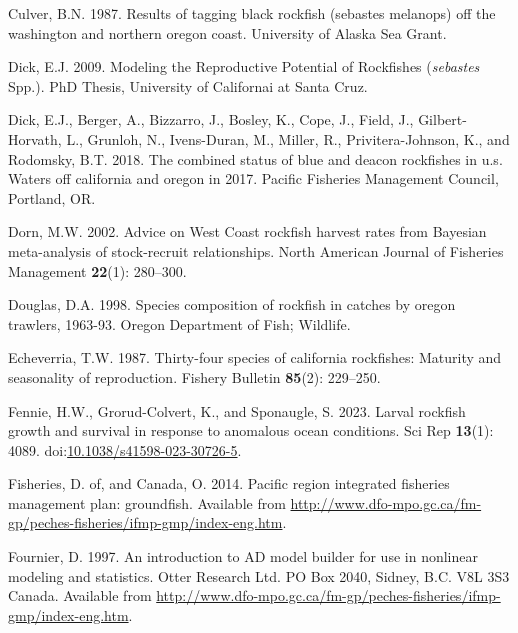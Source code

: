 \documentclass[11pt,
  letterpaper,
]{article}
\newlength{\cslhangindent}
\newenvironment{CSLReferences}[2] %
 {%
  \setlength{\parindent}{0pt}
  \ifodd #1 \everypar{\setlength{\hangindent}{\cslhangindent}}\ignorespaces\fi
  \ifnum #2 > 0
  \setlength{\parskip}{#2\baselineskip}
  \fi
 }%
 {}
\begin{document}
\begin{CSLReferences}{1}{0}
\leavevmode{}%
Culver, B.N. 1987. Results of tagging black rockfish (sebastes melanops) off the washington and northern oregon coast. University of Alaska Sea Grant.

\leavevmode{}%
Dick, E.J. 2009. Modeling the {Reproductive} {Potential} of {Rockfishes} (\emph{sebastes} {Spp}.). PhD Thesis, University of Californai at Santa Cruz.

\leavevmode{}%
Dick, E.J., Berger, A., Bizzarro, J., Bosley, K., Cope, J., Field, J., Gilbert-Horvath, L., Grunloh, N., Ivens-Duran, M., Miller, R., Privitera-Johnson, K., and Rodomsky, B.T. 2018. The combined status of blue and deacon rockfishes in u.s. Waters off california and oregon in 2017. Pacific Fisheries Management Council, Portland, {OR}.

\leavevmode{}%
Dorn, M.W. 2002. Advice on {West} {Coast} rockfish harvest rates from {B}ayesian meta-analysis of stock-recruit relationships. North American Journal of Fisheries Management \textbf{22}(1): 280--300.

\leavevmode{}%
Douglas, D.A. 1998. Species composition of rockfish in catches by oregon trawlers, 1963-93. Oregon Department of Fish; Wildlife.

\leavevmode{}%
Echeverria, T.W. 1987. Thirty-four species of california rockfishes: Maturity and seasonality of reproduction. Fishery Bulletin \textbf{85}(2): 229--250.

\leavevmode{}%
Fennie, H.W., Grorud-Colvert, K., and Sponaugle, S. 2023. Larval rockfish growth and survival in response to anomalous ocean conditions. Sci Rep \textbf{13}(1): 4089. doi:\href{https://doi.org/10.1038/s41598-023-30726-5}{10.1038/s41598-023-30726-5}.

\leavevmode{}%
Fisheries, D. of, and Canada, O. 2014. Pacific region integrated fisheries management plan: groundfish. Available from \url{http://www.dfo-mpo.gc.ca/fm-gp/peches-fisheries/ifmp-gmp/index-eng.htm}.

\leavevmode{}%
Fournier, D. 1997. An introduction to AD model builder for use in nonlinear modeling and statistics. Otter Research Ltd. PO Box 2040, Sidney, B.C. V8L 3S3 Canada. Available from \url{http://www.dfo-mpo.gc.ca/fm-gp/peches-fisheries/ifmp-gmp/index-eng.htm}.


\end{CSLReferences}
\end{document}
